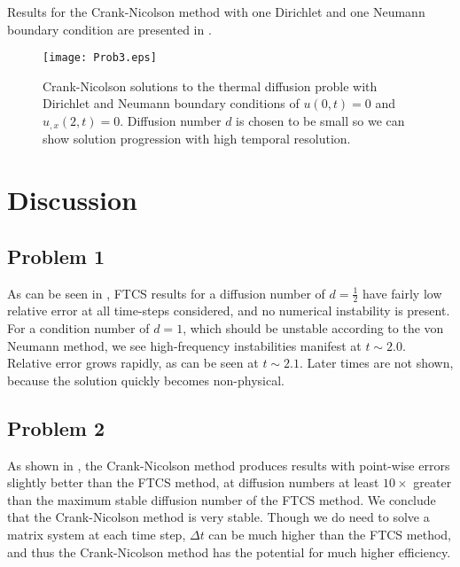 \documentclass[11pt]{article}
\begin{document}
Results for the Crank-Nicolson method with one Dirichlet and one Neumann boundary condition are presented in .

\begin{figure}[h!]
\begin{center}
\texttt{[image: Prob3.eps]}
\\[-0.5cm]
\caption{Crank-Nicolson solutions to the thermal diffusion proble with Dirichlet and Neumann boundary conditions of $u(0,t) = 0$ and $u_{,x}(2,t) = 0$. Diffusion number $d$ is chosen to be small so we can show solution progression with high temporal resolution.}
\label{fig:Prob3}
\end{center}
\end{figure}

\section{Discussion} %

\subsection{Problem 1}

As can be seen in , FTCS results for a diffusion number of $d=\tfrac{1}{2}$ have fairly low relative error at all time-steps considered, and no numerical instability is present. For a condition number of $d=1$, which should be unstable according to the von Neumann method, we see high-frequency instabilities manifest at $t \sim 2.0$. Relative error grows rapidly, as can be seen at $t \sim 2.1$. Later times are not shown, because the solution quickly becomes non-physical.

\subsection{Problem 2}

As shown in , the Crank-Nicolson method produces results with point-wise errors slightly better than the FTCS method, at diffusion numbers at least $10\times$ greater than the maximum stable diffusion number of the FTCS method. We conclude that the Crank-Nicolson method is very stable. Though we do need to solve a matrix system at each time step, $\Delta t$ can be much higher than the FTCS method, and thus the Crank-Nicolson method has the potential for much higher efficiency.
\end{document}
